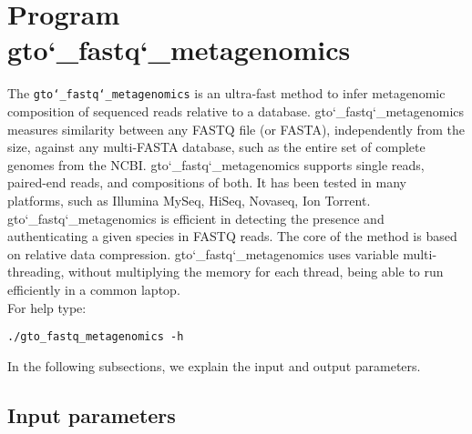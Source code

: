 \section{Program gto\char`_fastq\char`_metagenomics}
The \texttt{gto\char`_fastq\char`_metagenomics} is an ultra-fast method to infer metagenomic composition of sequenced reads relative to a database. gto\char`_fastq\char`_metagenomics measures similarity between any FASTQ file (or FASTA), independently from the size, against any multi-FASTA database, such as the entire set of complete genomes from the NCBI. gto\char`_fastq\char`_metagenomics supports single reads, paired-end reads, and compositions of both. It has been tested in many platforms, such as Illumina MySeq, HiSeq, Novaseq, Ion Torrent.\\
gto\char`_fastq\char`_metagenomics is efficient in detecting the presence and authenticating a given species in FASTQ reads. The core of the method is based on relative data compression. gto\char`_fastq\char`_metagenomics uses variable multi-threading, without multiplying the memory for each thread, being able to run efficiently in a common laptop.\\
For help type:
\begin{lstlisting}
./gto_fastq_metagenomics -h
\end{lstlisting}
In the following subsections, we explain the input and output parameters.

\subsection*{Input parameters}

